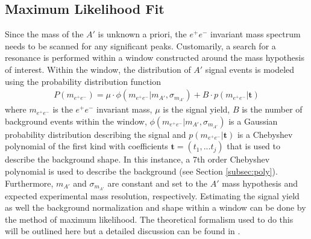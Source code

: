 \subsection{Maximum Likelihood Fit}

Since the mass of the $A'$ is unknown a priori, the 
$e^+e^-$ invariant mass spectrum needs to be scanned for any significant peaks.
Customarily, a search for a resonance is performed within a
window constructed around the mass hypothesis of interest.  Within the window,
the distribution of $A'$ signal events is modeled using the probability 
distribution function
\begin{equation}
    \begin{split}
    P(m_{e^+e^-}) 
        = 
        \mu \cdot \phi(m_{e^+e^-} | m_{A'}, \sigma_{m_{A'}}) + B\cdot p(m_{e^+e^-} | \mathbf{t})
    \end{split}
\end{equation}
where $m_{e^+e^-}$ is the $e^+e^-$ invariant mass, $\mu$ is the signal yield,
$B$ is the number of background events within the window, 
$\phi(m_{e^+e^-} | m_{A'}, \sigma_{m_{A'}})$ is a Gaussian probability distribution describing
the signal and $p(m_{e^+e^-} | \mathbf{t})$ is a Chebyshev polynomial of the first kind
with coefficients $\mathbf{t} = (t_{1}, ... t_{j})$ that is used to describe the background shape. In this
instance, a 7th order Chebyshev polynomial is used to describe the background
(see Section \ref{subsec:poly}).  Furthermore, $m_{A'}$ and $\sigma_{m_{A'}}$
are constant and set to the $A'$ mass hypothesis and expected experimental 
mass resolution, respectively.
Estimating the 
signal yield as well the background normalization and shape within a window can be
done by the method of maximum likelihood.  The theoretical formalism
used to do this will be outlined here but a detailed discussion can be found in
\cite{Cowan:2010js}.

